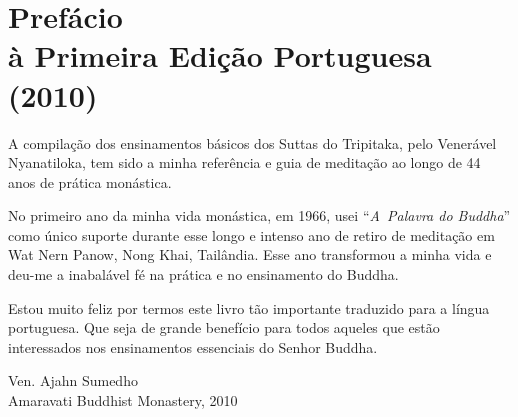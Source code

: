 \chapter[Prefácio à Primeira Edição Portuguesa (2010)]{Prefácio\\ à Primeira Edição Portuguesa\\ (2010)}

A compilação dos ensinamentos básicos dos Suttas do Tripitaka, pelo Venerável
Nyanatiloka, tem sido a minha referência e guia de meditação ao longo de 44 anos
de prática monástica.

No primeiro ano da minha vida monástica, em 1966, usei ``\emph{A~\mbox{Palavra} do
  Buddha}'' como único suporte durante esse longo e intenso ano de retiro de
meditação em Wat Nern Panow, Nong Khai, Tailândia. Esse ano transformou a minha
vida e deu-me a inabalável fé na prática e no ensinamento do Buddha.

Estou muito feliz por termos este livro tão importante traduzido para a língua
portuguesa. Que seja de grande benefício para todos aqueles que estão
interessados nos ensinamentos essenciais do Senhor Buddha.

\bigskip

{\raggedleft
  Ven. Ajahn Sumedho\\
  Amaravati Buddhist Monastery, 2010
\par}

